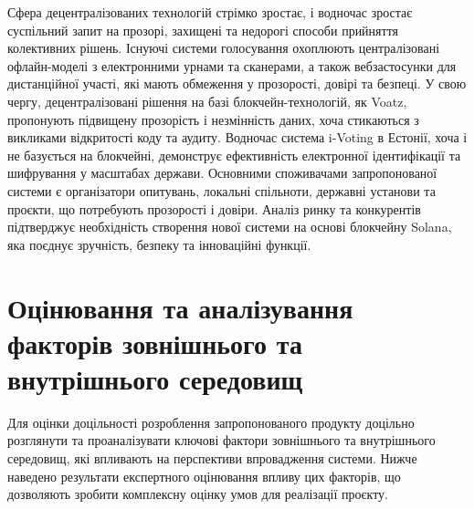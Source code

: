 \documentclass[14pt]{extreport}
\begin{document}
  Сфера децентралізованих технологій стрімко зростає, і водночас зростає суспільний запит на прозорі, захищені та недорогі способи прийняття колективних рішень. Існуючі системи голосування охоплюють централізовані офлайн-моделі з електронними урнами та сканерами, а також вебзастосунки для дистанційної участі, які мають обмеження у прозорості, довірі та безпеці. У свою чергу, децентралізовані рішення на базі блокчейн-технологій, як Voatz, пропонують підвищену прозорість і незмінність даних, хоча стикаються з викликами відкритості коду та аудиту. Водночас система i-Voting в Естонії, хоча і не базується на блокчейні, демонструє ефективність електронної ідентифікації та шифрування у масштабах держави. Основними споживачами запропонованої системи є організатори опитувань, локальні спільноти, державні установи та проєкти, що потребують прозорості і довіри. Аналіз ринку та конкурентів підтверджує необхідність створення нової системи на основі блокчейну Solana, яка поєднує зручність, безпеку та інноваційні функції.
  
  \section{Оцінювання та аналізування факторів зовнішнього та внутрішнього середовищ}
  
  Для оцінки доцільності розроблення запропонованого продукту доцільно розглянути та проаналізувати ключові фактори зовнішнього та внутрішнього середовищ, які впливають на перспективи впровадження системи. Нижче наведено результати експертного оцінювання впливу цих факторів, що дозволяють зробити комплексну оцінку умов для реалізації проєкту.
  
\end{document}

